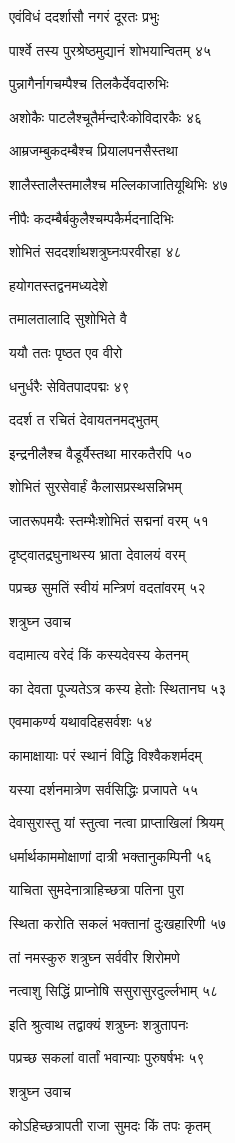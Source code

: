 एवंविधं ददर्शासौ नगरं दूरतः प्रभुः

पार्श्वे तस्य पुरश्रेष्ठमुद्यानं शोभयान्वितम् ४५

पुन्नागैर्नागचम्पैश्च तिलकैर्देवदारुभिः

अशोकैः पाटलैश्चूतैर्मन्दारैःकोविदारकैः ४६

आम्रजम्बुकदम्बैश्च प्रियालपनसैस्तथा

शालैस्तालैस्तमालैश्च मल्लिकाजातियूथिभिः ४७

नीपैः कदम्बैर्बकुलैश्चम्पकैर्मदनादिभिः

शोभितं सददर्शाथशत्रुघ्नःपरवीरहा ४८

हयोगतस्तद्वनमध्यदेशे

तमालतालादि सुशोभिते वै

ययौ ततः पृष्ठत एव वीरो

धनुर्धरैः सेवितपादपद्मः ४९

ददर्श त रचितं देवायतनमद्भुतम्

इन्द्रनीलैश्च वैडूर्यैस्तथा मारकतैरपि ५०

शोभितं सुरसेवार्हं कैलासप्रस्थसन्निभम्

जातरूपमयैः स्तम्भैःशोभितं सद्मनां वरम् ५१

दृष्ट्वातद्रघुनाथस्य भ्राता देवालयं वरम्

पप्रच्छ सुमतिं स्वीयं मन्त्रिणं वदतांवरम् ५२

शत्रुघ्न उवाच

वदामात्य वरेदं किं कस्यदेवस्य केतनम्

का देवता पूज्यतेऽत्र कस्य हेतोः स्थितानघ ५३

एवमाकर्ण्य यथावदिहसर्वशः ५४

कामाक्षायाः परं स्थानं विद्धि विश्वैकशर्मदम्

यस्या दर्शनमात्रेण सर्वसिद्धिः प्रजापते ५५

देवासुरास्तु यां स्तुत्वा नत्वा प्राप्ताखिलां श्रियम्

धर्मार्थकाममोक्षाणां दात्री भक्तानुकम्पिनी ५६

याचिता सुमदेनात्राहिच्छत्रा पतिना पुरा

स्थिता करोति सकलं भक्तानां दुःखहारिणी ५७

तां नमस्कुरु शत्रुघ्न सर्ववीर शिरोमणे

नत्वाशु सिद्धिं प्राप्नोषि ससुरासुरदुर्ल्लभाम् ५८

इति श्रुत्वाथ तद्वाक्यं शत्रुघ्नः शत्रुतापनः

पप्रच्छ सकलां वार्तां भवान्याः पुरुषर्षभः ५९

शत्रुघ्न उवाच

कोऽहिच्छत्रापती राजा सुमदः किं तपः कृतम्

